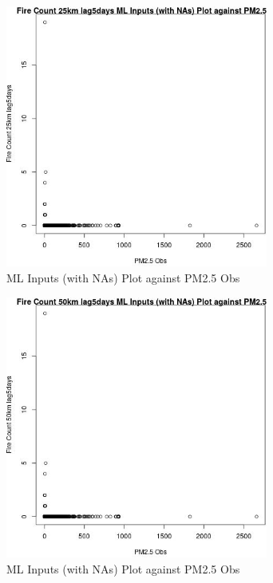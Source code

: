 \begin{figure} 
\centering  
\includegraphics[width=0.77\textwidth]{Code_Outputs/Report_ML_input_PM25_Step4_part_e_de_duplicated_aves_compiled_2019-05-21wNAs_Fire_Count_25km_lag5daysvPM25_Obs.jpg} 
\caption{\label{fig:Report_ML_input_PM25_Step4_part_e_de_duplicated_aves_compiled_2019-05-21wNAsFire_Count_25km_lag5daysvPM25_Obs}ML Inputs (with NAs) Plot against PM2.5 Obs} 
\end{figure} 
 

\begin{figure} 
\centering  
\includegraphics[width=0.77\textwidth]{Code_Outputs/Report_ML_input_PM25_Step4_part_e_de_duplicated_aves_compiled_2019-05-21wNAs_Fire_Count_50km_lag5daysvPM25_Obs.jpg} 
\caption{\label{fig:Report_ML_input_PM25_Step4_part_e_de_duplicated_aves_compiled_2019-05-21wNAsFire_Count_50km_lag5daysvPM25_Obs}ML Inputs (with NAs) Plot against PM2.5 Obs} 
\end{figure} 
 

